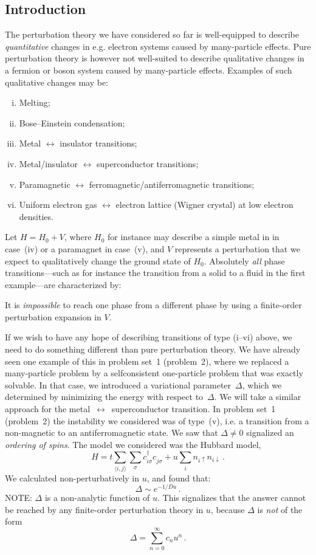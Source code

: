 \subsection{Introduction}
The perturbation theory we have considered so far is well-equipped to describe \emph{quantitative} changes in e.g. electron systems caused by many-particle effects.
Pure perturbation theory is however not well-suited to describe qualitative changes in a fermion or boson system caused by many-particle effects.
Examples of such qualitative changes may be:
\begin{enumerate}[(i)]
  \item Melting;
  \item Bose--Einstein condensation;
  \item Metal $\leftrightarrow$ insulator transitions;
  \item Metal/insulator  $\leftrightarrow$ superconductor transitions;
  \item Paramagnetic $\leftrightarrow$ ferromagnetic/antiferromagnetic transitions;
  \item Uniform electron gas $\leftrightarrow$ electron lattice (Wigner crystal) at low electron densities.
\end{enumerate}
Let $H = H_0 + V$, where $H_0$ for instance may describe a simple metal in in case~(iv) or a paramagnet in case~(v), and $V$ represents a perturbation that we expect to qualitatively change the ground state of $H_0$.
Absolutely \emph{all} phase transitions---such as for instance the transition from a solid to a fluid in the first example---are characterized by:

\begin{Indent}
  It is \emph{impossible} to reach one phase from a different phase by using a finite-order perturbation expansion in $V$.
\end{Indent}
If we wish to have any hope of describing transitions of type (i--vi) above, we need to do something different than pure perturbation theory.
We have already seen one example of this in problem set~1 (problem~2), where we replaced a many-particle problem by a selfconsistent one-particle problem that was exactly solvable.
In that case, we introduced a variational parameter~$\Delta$, which we determined by minimizing the energy with respect to~$\Delta$.
We will take a similar approach for the metal~$\leftrightarrow$~superconductor transition.
In problem set~1 (problem~2) the instability we considered was of type~(v), i.e. a transition from a non-magnetic to an antiferromagnetic state.
We saw that $\Delta\neq0$ signalized an \emph{ordering of spins}.
The model we considered was the Hubbard model,
\[
  H = t \sum_{\langle i,j \rangle} \sum_\sigma c^\dagger_{i\sigma} c^{\phantom{\dagger}}_{j\sigma} + u\sum_i n_{i\uparrow} n_{i\downarrow} \,.
\]
We calculated non-perturbatively in $u$, and found that:
\[
  \Delta \sim e^{-1/Du} \,.
\]
NOTE: $\Delta$ is a non-analytic function of $u$.
This signalizes that the answer cannot be reached by any finite-order perturbation theory in $u$, because $\Delta$ is \emph{not} of the form
\[
  \Delta = \sum_{n=0}^\infty c_n u^n\,.
\]



